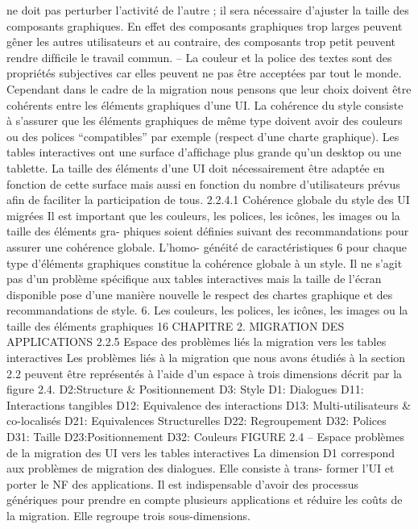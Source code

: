 \documentclass{article}
\begin{document}
ne doit pas perturber l’activité de l’autre ; il sera nécessaire d’ajuster la taille des composants
graphiques. En effet des composants graphiques trop larges peuvent gêner les autres utilisateurs
et au contraire, des composants trop petit peuvent rendre difﬁcile le travail commun.
– La couleur et la police des textes sont des propriétés subjectives car elles peuvent ne pas être
acceptées par tout le monde. Cependant dans le cadre de la migration nous pensons que leur
choix doivent être cohérents entre les éléments graphiques d’une UI. La cohérence du style
consiste à s’assurer que les éléments graphiques de même type doivent avoir des couleurs ou
des polices “compatibles” par exemple (respect d’une charte graphique).
Les tables interactives ont une surface d’afﬁchage plus grande qu’un desktop ou une tablette. La
taille des éléments d’une UI doit nécessairement être adaptée en fonction de cette surface mais aussi
en fonction du nombre d’utilisateurs prévus aﬁn de faciliter la participation de tous.
2.2.4.1
Cohérence globale du style des UI migrées
Il est important que les couleurs, les polices, les icônes, les images ou la taille des éléments gra-
phiques soient déﬁnies suivant des recommandations pour assurer une cohérence globale. L’homo-
généité de caractéristiques 6 pour chaque type d’éléments graphiques constitue la cohérence globale
à un style. Il ne s’agit pas d’un problème spéciﬁque aux tables interactives mais la taille de l’écran
disponible pose d’une manière nouvelle le respect des chartes graphique et des recommandations de
style.
6. Les couleurs, les polices, les icônes, les images ou la taille des éléments graphiques
16
CHAPITRE 2. MIGRATION DES APPLICATIONS
2.2.5
Espace des problèmes liés la migration vers les tables interactives
Les problèmes liés à la migration que nous avons étudiés à la section 2.2 peuvent être représentés
à l’aide d’un espace à trois dimensions décrit par la ﬁgure 2.4.
D2:Structure 
& Positionnement
D3: Style
D1: Dialogues
D11: Interactions 
tangibles
D12: Equivalence des 
interactions
D13: Multi-utilisateurs 
& co-localisés
D21: Equivalences 
Structurelles
D22: Regroupement 
D32: Polices
D31: Taille
D23:Positionnement
D32: Couleurs
FIGURE 2.4 – Espace problèmes de la migration des UI vers les tables interactives
La dimension D1 correspond aux problèmes de migration des dialogues. Elle consiste à trans-
former l’UI et porter le NF des applications. Il est indispensable d’avoir des processus génériques
pour prendre en compte plusieurs applications et réduire les coûts de la migration. Elle regroupe trois
sous-dimensions.
\end{document}
